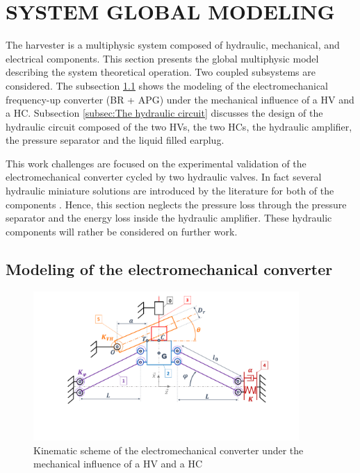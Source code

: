\documentclass[3p,twocolumn,preprint]{elsarticle}
\begin{document}
\section{SYSTEM GLOBAL MODELING}
\label{sec:SYSTEM MODELING}
The harvester is a multiphysic system composed of hydraulic, mechanical, and electrical components. This section presents the global multiphysic model describing the system theoretical operation. Two coupled subsystems are considered. The subsection \ref{subsec:The electromechanical converter} shows the modeling of the electromechanical frequency-up converter (BR + APG) under the mechanical influence of a HV and a HC. Subsection \ref{subsec:The hydraulic circuit} discusses the design of the hydraulic circuit composed of the two HVs, the two HCs, the hydraulic amplifier, the pressure separator and the liquid filled earplug.

This work challenges are focused on the experimental validation of the electromechanical converter cycled by two hydraulic valves. In fact several hydraulic miniature solutions are introduced by the literature for both of the components \cite{Wang2020,Xu2021,Zhu2013}. Hence, this section neglects the pressure loss through the pressure separator and the energy loss inside the hydraulic amplifier. These hydraulic components will rather be considered on further work. 

	\subsection{Modeling of the electromechanical converter}	
	\label{subsec:The electromechanical converter}
\begin{figure}[!htbp]
	\centering
	\captionsetup{justification=centering}
	\includegraphics[trim={0cm 0cm 0cm 0cm},clip, width=0.9\textwidth]{figures/schema_cinematique1.pdf}
	\caption{Kinematic scheme of the electromechanical converter under the mechanical influence of a HV and a HC}
	\label{fig:schema_cinematique1}
\end{figure}
\end{document}

